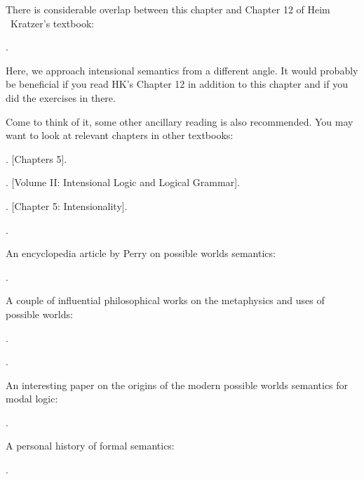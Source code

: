 {\setlength{\parindent}{0pt}\nonzeroparskip

  There is considerable overlap between this chapter and Chapter 12 of
  Heim \amp\ Kratzer's textbook:
\begin{bibentrylist}
	\item {}. 
\end{bibentrylist}

Here, we approach intensional semantics from a different angle. It
would probably be beneficial if you read H\amp K's Chapter 12 in
addition to this chapter and if you did the exercises in there.

Come to think of it, some other ancillary reading is also recommended.
You may want to look at relevant chapters in other textbooks:
\begin{bibentrylist}
	\item {}. [Chapters 5]. 
	\item {}. [Volume II: Intensional Logic and Logical Grammar]. 
	\item
          .
          [Chapter 5: Intensionality]. 
        \item {}.
\end{bibentrylist}

An encyclopedia article by Perry on possible worlds semantics:
\begin{bibentrylist}
	\item {}. 
\end{bibentrylist}

A couple of influential philosophical works on the metaphysics and
uses of possible worlds:
\begin{bibentrylist}
	\item {}. 
	\item {}. 
\end{bibentrylist}

An interesting paper on the origins of the modern possible worlds
semantics for modal logic:
\begin{bibentrylist}
	\item {}.
\end{bibentrylist}

A personal history of formal semantics:
\begin{bibentrylist}
	\item {}.
\end{bibentrylist}

}
